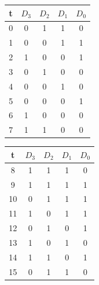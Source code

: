 \begin{center}
\begin{minipage}{0.45\textwidth}
\begin{tabular}{ c | c | c | c | c }
 \label{table:lfsr}
  t & $D_3$ & $D_2$ & $D_1$ & $D_0$ \\ \hline
  0 & 0 & 1 & 1 & 0 \\
  1 & 0& 0& 1& 1\\
  2 & 1&0 &0 &1 \\
  3 & 0& 1& 0& 0\\
  4 & 0&0 &1 &0 \\
  5 & 0&0 &0 &1 \\
  6 & 1&0 &0 &0 \\
  7 & 1&1 &0 &0 \\
  \end{tabular}
\end{minipage}\hfill
\begin{minipage}{0.45\textwidth} 
\begin{tabular}{ c | c | c | c | c }
  t & $D_3$ & $D_2$ & $D_1$ & $D_0$ \\ \hline
  8  & 1& 1& 1& 0\\
  9  & 1& 1& 1& 1\\
  10 & 0& 1& 1& 1\\
  11 & 1& 0& 1& 1\\
  12 & 0& 1& 0& 1\\
  13 & 1& 0& 1& 0\\
  14 & 1& 1& 0& 1\\
  15 & 0& 1& 1& 0\\
\end{tabular}
\end{minipage}
\end{center}

